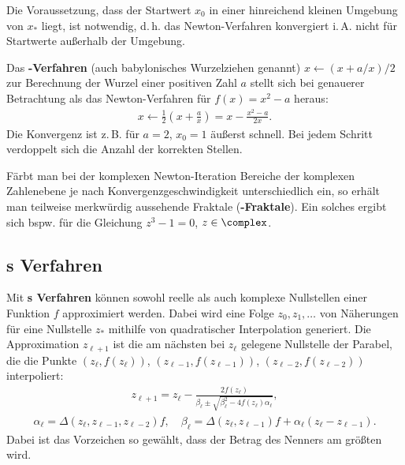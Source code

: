 Die Voraussetzung, dass der Startwert $x_0$ in einer hinreichend kleinen
Umgebung von $x_\ast$ liegt, ist notwendig, d.\,h. das Newton-Verfahren
konvergiert i.\,A. nicht für Startwerte außerhalb der Umgebung.

\linie

Das \textbf{-Verfahren} (auch babylonisches Wurzelziehen genannt)
$x \leftarrow (x + a/x) / 2$ zur Berechnung der Wurzel einer positiven Zahl $a$
stellt sich bei genauerer Betrachtung
als das Newton-Verfahren für $f(x) = x^2 - a$ heraus:
\begin{align*}
    x \leftarrow \frac{1}{2} \left(x + \frac{a}{x}\right)
    = x - \frac{x^2 - a}{2x}.
\end{align*}
Die Konvergenz ist z.\,B. für $a = 2$, $x_0 = 1$ äußerst schnell.
Bei jedem Schritt verdoppelt sich die Anzahl der korrekten Stellen.

\linie

Färbt man bei der komplexen Newton-Iteration Bereiche der komplexen Zahlenebene
je nach Konvergenzgeschwindigkeit unterschiedlich ein, so erhält man
teilweise merkwürdig aussehende Fraktale (\textbf{-Fraktale}).
Ein solches ergibt sich bspw. für die Gleichung
$z^3 - 1 = 0$, $z \in \complex$.

\subsection{%
    s Verfahren%
}

Mit \textbf{s Verfahren} können sowohl reelle als auch komplexe
Nullstellen einer Funktion $f$ approximiert werden.
Dabei wird eine Folge $z_0, z_1, \dotsc$ von Näherungen für eine Nullstelle
$z_\ast$ mithilfe von quadratischer Interpolation generiert.
Die Approximation $z_{\ell+1}$ ist die am nächsten bei $z_\ell$ gelegene
Nullstelle der Parabel, die die Punkte $(z_\ell, f(z_\ell))$,
$(z_{\ell-1}, f(z_{\ell-1}))$, $(z_{\ell-2}, f(z_{\ell-2}))$ interpoliert:
\begin{align*}
    z_{\ell+1} = z_\ell -
    \frac{2 f(z_\ell)}{\beta_\ell \pm
    \sqrt{\beta_\ell^2 - 4 f(z_\ell) \alpha_\ell}},
\end{align*}
\begin{align*}
    \alpha_\ell = \Delta(z_\ell, z_{\ell-1}, z_{\ell-2}) f, \quad
    \beta_\ell =
    \Delta(z_\ell, z_{\ell-1}) f + \alpha_\ell(z_\ell - z_{\ell-1}).
\end{align*}
Dabei ist das Vorzeichen so gewählt, dass der Betrag des Nenners am größten
wird.

